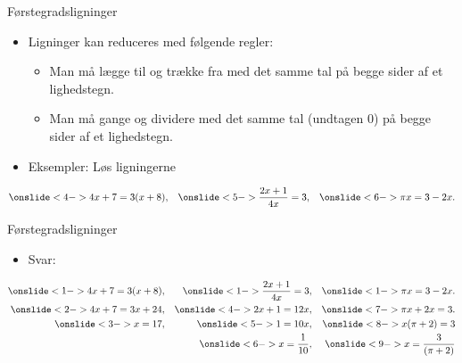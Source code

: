 \begin{frame}{Førstegradsligninger}
\begin{itemize}
		\setlength\itemsep{1em}
	\item<1-> Ligninger kan reduceres med følgende regler:
	\begin{itemize}
			\setlength\itemsep{1em}
		\item<2-> Man må lægge til og trække fra med det samme tal på begge sider af et lighedstegn.
		\item<3-> Man må gange og dividere med det samme tal (undtagen 0) på begge sider af et lighedstegn.
	\end{itemize}
	\item<4-> Eksempler: Løs ligningerne

\end{itemize}
	\begin{align*}
\onslide<4->{4x+7=3(x+8),}&& \onslide<5->{\frac{2x+1}{4x}=3,}&& \onslide<6->{\pi x=3-2x.}\\
\end{align*}
\end{frame}
\setbeamercovered{} 
\begin{frame}{Førstegradsligninger}
	\begin{itemize}
		\item Svar:
	\end{itemize}
	\begin{align*}
\onslide<1->{4x+7=3(x+8),}&& \onslide<1->{\frac{2x+1}{4x}=3,}&& \onslide<1->{\pi x=3-2x.}\\
\onslide<2->{4x+7=3x+24,}&& \onslide<4->{2x+1=12x,}&& \onslide<7->{\pi x+2x=3.}\\
\onslide<3->{x=17,}&& \onslide<5->{1=10x,}&& \onslide<8->{x(\pi+2)=3}\\
				&& \onslide<6->{x=\frac{1}{10},}&& \onslide<9->{x=\frac{3}{(\pi+2)}}\\
\end{align*}
\end{frame}


